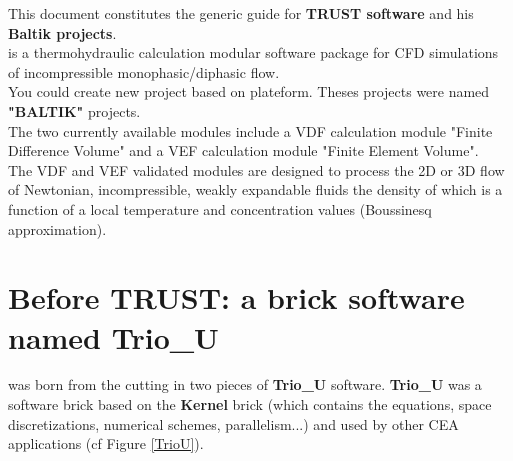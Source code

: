 This document constitutes the generic guide for \textbf{TRUST software} and his \textbf{Baltik projects}.\\

\trust is a thermohydraulic calculation modular software package for CFD simulations of incompressible monophasic/diphasic flow.\\

You could create new project based on \trust plateform. Theses projects were named \textbf{"BALTIK"} projects.\\

The two currently available modules include a VDF calculation module "Finite Difference Volume" and a VEF calculation module "Finite Element Volume". \\

The VDF and VEF validated modules are designed to process the 2D or 3D flow of Newtonian, incompressible, weakly expandable fluids the density of which is a function of a local temperature and concentration values (Boussinesq approximation).



\section{Before TRUST: a brick software named Trio\_U}

\trust was born from the cutting in two pieces of \textbf{Trio\_U} software.
\textbf{Trio\_U} was a software brick based on the \textbf{Kernel} brick (which contains the equations, space discretizations, numerical schemes, parallelism...) and used by other CEA applications (cf Figure \ref{TrioU}).


